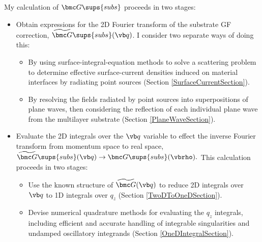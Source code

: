\documentclass[letterpaper]{article}
\renewcommand{\wt}{\widetilde}
\begin{document}
My calculation of $\bmc G\sups{subs}$ proceeds in two stages:
\begin{itemize}
 \item Obtain expressions for the 2D Fourier transform of the
       substrate GF correction, $\wt{\bmc G}\sups{subs}(\vb q)$.
       I consider two separate ways of doing this:
       \begin{itemize}
         \item By using surface-integral-equation methods to solve
               a scattering problem to determine effective 
               surface-current densities induced on material interfaces
               by radiating point sources (Section \ref{SurfaceCurrentSection}).
         \item By resolving the fields radiated by point sources
               into superpositions of plane waves, then considering the 
               reflection of each individual plane wave from the 
               multilayer substrate (Section \ref{PlaneWaveSection}).
       \end{itemize}
         
 \item Evaluate the 2D integrals over the $\vb q$ variable
       to effect the inverse Fourier transform from momentum space
       to real space,
       $\wt{\bmc G}\sups{subs}(\vb q) \to \bmc G\sups{subs}(\vbrho).$
       This calculation proceeds in two stages:
       \begin{itemize}
         \item Use the known structure of $\wt{\bmc G}(\vb q)$
               to reduce 2D integrals over $\vb q$ to 1D integrals over $q_z$
               (Section \ref{TwoDToOneDSection}).
         \item Devise numerical quadrature methods for evaluating the
               $q_z$ integrals, including efficient and accurate handling
               of integrable singularities and undamped oscillatory integrands
               (Section \ref{OneDIntegralSection}).
       \end{itemize}
\end{itemize}

\end{document}
